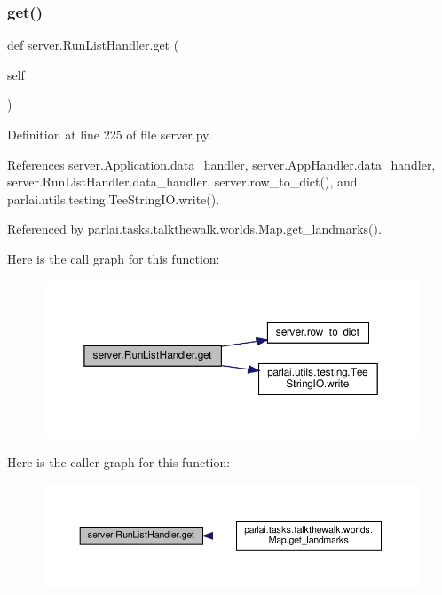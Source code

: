 \subsubsection{\texorpdfstring{get()}{get()}}
{\footnotesize\ttfamily def server.\+Run\+List\+Handler.\+get (\begin{DoxyParamCaption}\item[{}]{self }\end{DoxyParamCaption})}



Definition at line 225 of file server.\+py.



References server.\+Application.\+data\+\_\+handler, server.\+App\+Handler.\+data\+\_\+handler, server.\+Run\+List\+Handler.\+data\+\_\+handler, server.\+row\+\_\+to\+\_\+dict(), and parlai.\+utils.\+testing.\+Tee\+String\+I\+O.\+write().



Referenced by parlai.\+tasks.\+talkthewalk.\+worlds.\+Map.\+get\+\_\+landmarks().

Here is the call graph for this function\+:
\nopagebreak
\begin{figure}[H]
\begin{center}
\leavevmode
\includegraphics[width=350pt]{classserver_1_1RunListHandler_a1d58f9257d63a959cd70d67aa7422747_cgraph}
\end{center}
\end{figure}
Here is the caller graph for this function\+:
\nopagebreak
\begin{figure}[H]
\begin{center}
\leavevmode
\includegraphics[width=350pt]{classserver_1_1RunListHandler_a1d58f9257d63a959cd70d67aa7422747_icgraph}
\end{center}
\end{figure}
\mbox{\label{classserver_1_1RunListHandler_a91115365c990c3153e1d8ea83303f21f}} 
